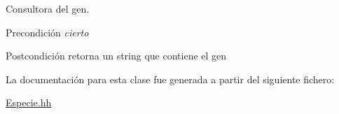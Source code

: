Consultora del gen. 

\begin{DoxyPrecond}{Precondición}
{\itshape cierto} 
\end{DoxyPrecond}
\begin{DoxyPostcond}{Postcondición}
retorna un string que contiene el gen 
\end{DoxyPostcond}


La documentación para esta clase fue generada a partir del siguiente fichero\+:\begin{DoxyCompactItemize}
\item 
\hyperlink{_especie_8hh}{Especie.\+hh}\end{DoxyCompactItemize}
